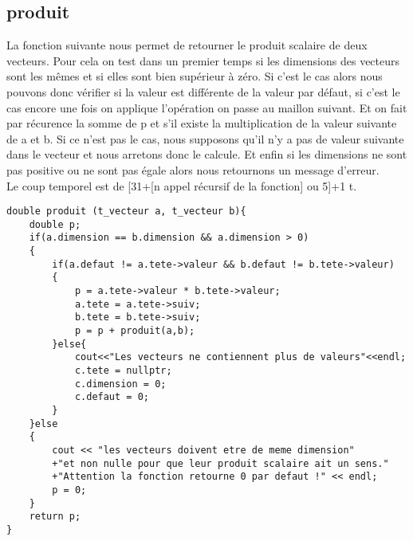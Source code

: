 \documentclass[a4paper,11pt,final]{article}
\begin{document}
\subsection{produit}
La fonction suivante nous permet de retourner le produit scalaire de deux vecteurs. Pour cela on test dans un premier temps si les dimensions des vecteurs sont les mêmes et si elles sont bien supérieur à zéro. Si c'est le cas alors nous pouvons donc vérifier si la valeur est différente de la valeur par défaut, si c'est le cas encore une fois on applique l'opération on passe au maillon suivant. Et on fait par récurence la somme de p et s'il existe la multiplication de la valeur suivante de a et b. Si ce n'est pas le cas, nous supposons qu'il n'y a pas de valeur suivante dans le vecteur et nous arretons donc le calcule. Et enfin si les dimensions ne sont pas positive ou ne sont pas égale alors nous retournons un message d'erreur. \\
Le coup temporel est de [31+[n appel récursif de la fonction] ou 5]+1 t.
\begin{verbatim}
double produit (t_vecteur a, t_vecteur b){
    double p;
    if(a.dimension == b.dimension && a.dimension > 0)
    {
        if(a.defaut != a.tete->valeur && b.defaut != b.tete->valeur)
        {
            p = a.tete->valeur * b.tete->valeur;
            a.tete = a.tete->suiv;
            b.tete = b.tete->suiv;
            p = p + produit(a,b);
        }else{
            cout<<"Les vecteurs ne contiennent plus de valeurs"<<endl;
            c.tete = nullptr;
            c.dimension = 0;
            c.defaut = 0;
        }
    }else
    {
        cout << "les vecteurs doivent etre de meme dimension"
        +"et non nulle pour que leur produit scalaire ait un sens."
        +"Attention la fonction retourne 0 par defaut !" << endl;
        p = 0;
    }
    return p;
}
\end{verbatim}
\end{document}
